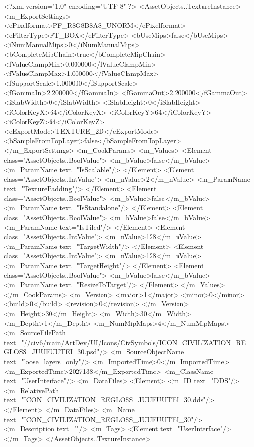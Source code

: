 <?xml version="1.0" encoding="UTF-8" ?>
<AssetObjects..TextureInstance>
	<m_ExportSettings>
		<ePixelformat>PF_R8G8B8A8_UNORM</ePixelformat>
		<eFilterType>FT_BOX</eFilterType>
		<bUseMips>false</bUseMips>
		<iNumManualMips>0</iNumManualMips>
		<bCompleteMipChain>true</bCompleteMipChain>
		<fValueClampMin>0.000000</fValueClampMin>
		<fValueClampMax>1.000000</fValueClampMax>
		<fSupportScale>1.000000</fSupportScale>
		<fGammaIn>2.200000</fGammaIn>
		<fGammaOut>2.200000</fGammaOut>
		<iSlabWidth>0</iSlabWidth>
		<iSlabHeight>0</iSlabHeight>
		<iColorKeyX>64</iColorKeyX>
		<iColorKeyY>64</iColorKeyY>
		<iColorKeyZ>64</iColorKeyZ>
		<eExportMode>TEXTURE_2D</eExportMode>
		<bSampleFromTopLayer>false</bSampleFromTopLayer>
	</m_ExportSettings>
	<m_CookParams>
		<m_Values>
			<Element class="AssetObjects..BoolValue">
				<m_bValue>false</m_bValue>
				<m_ParamName text="IsScalable"/>
			</Element>
			<Element class="AssetObjects..IntValue">
				<m_nValue>2</m_nValue>
				<m_ParamName text="TexturePadding"/>
			</Element>
			<Element class="AssetObjects..BoolValue">
				<m_bValue>false</m_bValue>
				<m_ParamName text="IsStandalone"/>
			</Element>
			<Element class="AssetObjects..BoolValue">
				<m_bValue>false</m_bValue>
				<m_ParamName text="IsTiled"/>
			</Element>
			<Element class="AssetObjects..IntValue">
				<m_nValue>128</m_nValue>
				<m_ParamName text="TargetWidth"/>
			</Element>
			<Element class="AssetObjects..IntValue">
				<m_nValue>128</m_nValue>
				<m_ParamName text="TargetHeight"/>
			</Element>
			<Element class="AssetObjects..BoolValue">
				<m_bValue>false</m_bValue>
				<m_ParamName text="ResizeToTarget"/>
			</Element>
		</m_Values>
	</m_CookParams>
	<m_Version>
		<major>1</major>
		<minor>0</minor>
		<build>0</build>
		<revision>0</revision>
	</m_Version>
	<m_Height>30</m_Height>
	<m_Width>30</m_Width>
	<m_Depth>1</m_Depth>
	<m_NumMipMaps>4</m_NumMipMaps>
	<m_SourceFilePath text="//civ6/main/ArtDev/UI/Icons/CivSymbols/ICON_CIVILIZATION_REGLOSS_JUUFUUTEI_30.psd"/>
	<m_SourceObjectName text="loose_layers_only"/>
	<m_ImportedTime>0</m_ImportedTime>
	<m_ExportedTime>2027138</m_ExportedTime>
	<m_ClassName text="UserInterface"/>
	<m_DataFiles>
		<Element>
			<m_ID text="DDS"/>
			<m_RelativePath text="ICON_CIVILIZATION_REGLOSS_JUUFUUTEI_30.dds"/>
		</Element>
	</m_DataFiles>
	<m_Name text="ICON_CIVILIZATION_REGLOSS_JUUFUUTEI_30"/>
	<m_Description text=""/>
	<m_Tags>
		<Element text="UserInterface"/>
	</m_Tags>
</AssetObjects..TextureInstance>

